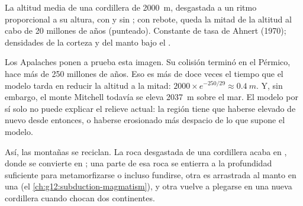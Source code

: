 \begin{omfigure}

{\small La altitud media de una cordillera de \qty{2000}{m}, desgastada a un
ritmo proporcional a su altura, con y sin ; con rebote,
queda la mitad de la altitud al cabo de 20 millones de años (punteado).
Constante de tasa de Ahnert (1970); densidades de la corteza y del manto bajo
el .}
\end{omfigure}

Los Apalaches ponen a prueba esta imagen. Su colisión terminó en el Pérmico,
hace más de 250 millones de años. Eso es más de doce veces el tiempo que el
modelo tarda en reducir la altitud a la mitad: $2000 \times e^{-250/29} \approx
\qty{0.4}{m}$. Y, sin embargo, el monte Mitchell todavía se eleva
\qty{2037}{m} sobre el mar. El modelo por sí solo no puede explicar el relieve
actual: la región tiene que haberse elevado de nuevo desde entonces, o haberse
erosionado más despacio de lo que supone el modelo.

Así, las montañas se reciclan. La roca desgastada de una cordillera acaba en
, donde se convierte en ; una parte de esa
roca se entierra a la profundidad suficiente para metamorfizarse o incluso
fundirse, otra es arrastrada al manto en una  (el
\cref{ch:g12:subduction-magmatism}), y otra vuelve a plegarse en una nueva
cordillera cuando chocan dos continentes.

